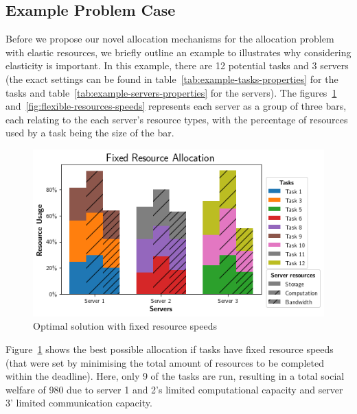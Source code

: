 \subsection{Example Problem Case}\label{subsec:example-problem-case}
Before we propose our novel allocation mechanisms for the allocation problem with elastic resources, we briefly
outline an example to illustrates why considering elasticity is important. In this example, there are 12 potential
tasks and 3 servers (the exact settings can be found in table~\ref{tab:example-tasks-properties} for the tasks and
table~\ref{tab:example-servers-properties} for the servers). The figures~\ref{fig:fixed-resources-speeds}
and~\ref{fig:flexible-resources-speeds} represents each server as a group of three bars, each relating to the each
server's resource types, with the percentage of resources used by a task being the size of the bar.

\begin{figure}[th]
    \centering
    \includegraphics[width=\linewidth]{figs/allocation/fixed_resource_allocation.png}
    \caption{Optimal solution with fixed resource speeds}
    \label{fig:fixed-resources-speeds}
\end{figure}

Figure~\ref{fig:fixed-resources-speeds} shows the best possible allocation if tasks have fixed resource speeds (that
were set by minimising the total amount of resources to be completed within the deadline). Here, only 9 of the tasks
are run, resulting in a total social welfare of 980 due to server 1 and 2's limited computational capacity and server
3' limited communication capacity.

